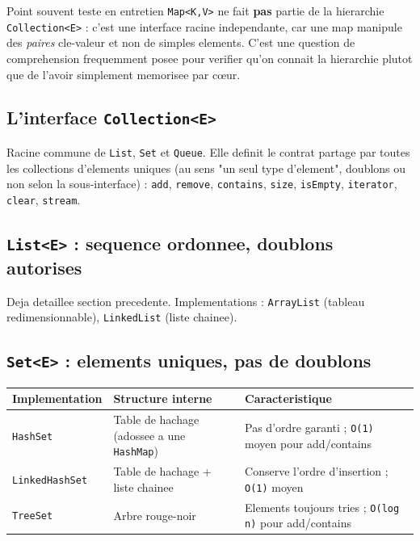 \documentclass[11pt,a4paper]{article}
\begin{document}
\begin{infobox}{Point souvent teste en entretien}
\texttt{Map<K,V>} ne fait \textbf{pas} partie de la hierarchie
\texttt{Collection<E>} : c'est une interface racine independante, car une map
manipule des \emph{paires} cle-valeur et non de simples elements. C'est une
question de comprehension frequemment posee pour verifier qu'on connait la
hierarchie plutot que de l'avoir simplement memorisee par cœur.
\end{infobox}

\subsection{L'interface \texttt{Collection<E>}}

Racine commune de \texttt{List}, \texttt{Set} et \texttt{Queue}. Elle definit
le contrat partage par toutes les collections d'elements uniques (au sens
"un seul type d'element", doublons ou non selon la sous-interface) :
\texttt{add}, \texttt{remove}, \texttt{contains}, \texttt{size},
\texttt{isEmpty}, \texttt{iterator}, \texttt{clear}, \texttt{stream}.

\subsection{\texttt{List<E>} : sequence ordonnee, doublons autorises}

Deja detaillee section precedente. Implementations : \texttt{ArrayList}
(tableau redimensionnable), \texttt{LinkedList} (liste chainee).

\subsection{\texttt{Set<E>} : elements uniques, pas de doublons}

\begin{longtable}{p{3.4cm}p{4.6cm}p{6cm}}
\toprule
\textbf{Implementation} & \textbf{Structure interne} & \textbf{Caracteristique} \\
\midrule
\endhead
\texttt{HashSet} & Table de hachage (adossee a une \texttt{HashMap}) & Pas d'ordre garanti ; \texttt{O(1)} moyen pour add/contains \\
\texttt{LinkedHashSet} & Table de hachage + liste chainee & Conserve l'ordre d'insertion ; \texttt{O(1)} moyen \\
\texttt{TreeSet} & Arbre rouge-noir & Elements toujours tries ; \texttt{O(log n)} pour add/contains \\
\bottomrule
\end{longtable}
\end{document}

